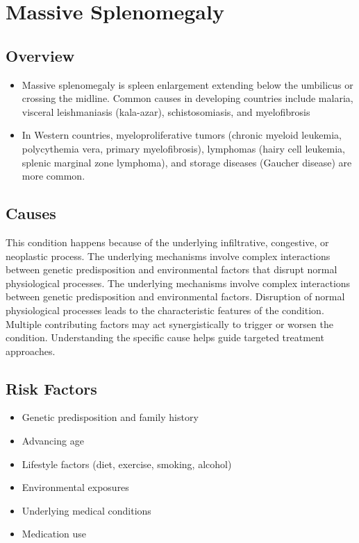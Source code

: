 \chapter{Massive Splenomegaly}
\label{sec:Massive Splenomegaly}

\section{Overview}


\begin{itemize}[noitemsep]
  \item Massive splenomegaly is spleen enlargement extending below the umbilicus or crossing the midline. Common causes in developing countries include malaria, visceral leishmaniasis (kala-azar), schistosomiasis, and myelofibrosis
  \item In Western countries, myeloproliferative tumors (chronic myeloid leukemia, polycythemia vera, primary myelofibrosis), lymphomas (hairy cell leukemia, splenic marginal zone lymphoma), and storage diseases (Gaucher disease) are more common.
\end{itemize}
\section{Causes}
This condition happens because of the underlying infiltrative, congestive, or neoplastic process. The underlying mechanisms involve complex interactions between genetic predisposition and environmental factors that disrupt normal physiological processes. The underlying mechanisms involve complex interactions between genetic predisposition and environmental factors. Disruption of normal physiological processes leads to the characteristic features of the condition. Multiple contributing factors may act synergistically to trigger or worsen the condition. Understanding the specific cause helps guide targeted treatment approaches.
\section{Risk Factors}


\begin{itemize}[noitemsep]
  \item Genetic predisposition and family history
  \item Advancing age
  \item Lifestyle factors (diet, exercise, smoking, alcohol)
  \item Environmental exposures
  \item Underlying medical conditions
  \item Medication use
\end{itemize}

